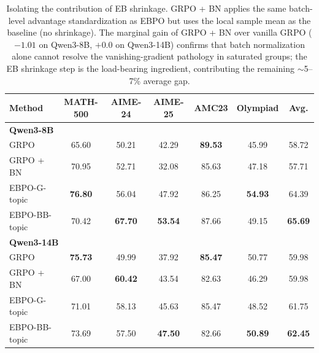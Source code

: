 \documentclass{article}
\theoremstyle{plain}
\theoremstyle{definition}
\theoremstyle{remark}
\newcommand{\oursG}{\textsc{EBPO-G}\xspace}
\newcommand{\oursBB}{\textsc{EBPO-BB}\xspace}
\begin{document}
\begin{table}[t]
\centering
\small
\begin{tabular}{lcccccc}
\toprule
\textbf{Method} & \textbf{MATH-500} & \textbf{AIME-24} & \textbf{AIME-25} & \textbf{AMC23} & \textbf{Olympiad} & \textbf{Avg.} \\
\midrule
\multicolumn{7}{l}{\textbf{Qwen3-8B}} \\
\midrule
GRPO          & 65.60          & 50.21          & 42.29          & \textbf{89.53} & 45.99          & 58.72 \\
GRPO + BN     & 70.95          & 52.71          & 32.08          & 85.63          & 47.18          & 57.71 \\
\oursG-topic  & \textbf{76.80} & 56.04          & 47.92          & 86.25          & \textbf{54.93} & 64.39 \\
\oursBB-topic & 70.42          & \textbf{67.70} & \textbf{53.54} & 87.66          & 49.15          & \textbf{65.69} \\
\midrule
\multicolumn{7}{l}{\textbf{Qwen3-14B}} \\
\midrule
GRPO          & \textbf{75.73} & 49.99          & 37.92          & \textbf{85.47} & 50.77          & 59.98 \\
GRPO + BN     & 67.00          & \textbf{60.42} & 43.54          & 82.63          & 46.29          & 59.98 \\
\oursG-topic  & 71.01          & 58.13          & 45.63          & 85.47          & 48.52          & 61.75 \\
\oursBB-topic & 73.69          & 57.50          & \textbf{47.50} & 82.66          & \textbf{50.89} & \textbf{62.45} \\
\bottomrule
\end{tabular}
\caption{Isolating the contribution of EB shrinkage. GRPO + BN applies the same batch-level advantage standardization as EBPO but uses the local sample mean as the baseline (no shrinkage). The marginal gain of GRPO + BN over vanilla GRPO ($-1.01$ on Qwen3-8B, $+0.0$ on Qwen3-14B) confirms that batch normalization alone cannot resolve the vanishing-gradient pathology in saturated groups; the EB shrinkage step is the load-bearing ingredient, contributing the remaining $\sim$5--7\% average gap.}
\label{tab:bn_ablation}
\end{table}
\end{document}
